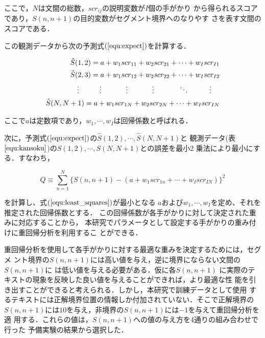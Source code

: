 ここで，$N$は文間の総数，$scr_{ij}$の説明変数が$I$個の手がかり
から得られるスコアであり，$S(n,n+1)$の目的変数がセグメント境界へのなりやす
さを表す文間のスコアである．

この観測データから次の予測式$(\ref{equ:expect})$を計算する．

\begin{eqnarray}\label{equ:expect}
\hat{S}(1,2)=a+w_{1}scr_{11}+w_{2}scr_{21}+
\cdots+w_{I}scr_{I1}\nonumber\\
\hat{S}(2,3)=a+w_{1}scr_{12}+w_{2}scr_{22}+
\cdots+w_{I}scr_{I2}\nonumber\\
\vdots\hspace{1.0cm}\vdots\hspace{1.2cm}\vdots\hspace{1.2cm}
\vdots\hspace{1.2cm}\ddots\hspace{1.0cm}\vdots\hspace{0.4cm}\nonumber\\
\hat{S}(N,N+1)=a+w_{1}scr_{1N}+w_{2}scr_{2N}+
\cdots+w_{I}scr_{IN}\nonumber\\
\end{eqnarray}

ここで$a$は定数項であり，$w_{1},\cdots,w_{I}$は回帰係数と呼ばれる．

次に，予測式$( \ref{equ:expect} )$の$\hat{S}(1,2),\cdots,\hat{S}(N,N+1)$と
観測データ(表$\ref{equ:kansoku}$)の$S(1,2),\cdots,S(N,N+1)$との誤差を最小2
乗法により最小にする．すなわち，

\begin{equation}\label{equ:least_squares}
Q\equiv
\sum_{n=1}^N \{S(n,n+1) -
(a+w_{1}scr_{1n}+ \cdots +w_{I}scr_{IN})\}^2
\end{equation}

\noindent を計算し、式$( \ref{equ:least_squares} )$が最小となる
$a$および$w_{1},\cdots,{w_I}$を定め、それを推定された回帰係数とする．
この回帰係数が各手がかりに対して決定された重みに対応することから，
本研究でパラメータとして設定する手がかりの重み付けに重回帰分析を利用するこ
とができる．

重回帰分析を使用して各手がかりに対する最適な重みを決定するためには，セグメ
ント境界の$S(n,n+1)$には高い値を与え，逆に境界にならない文間の$S(n,n+1)$に
は低い値を与える必要がある．仮に各$S(n,n+1)$
に実際のテキストの現象を反映した良い値を与えることができれば，より最適な性
能を引き出すことができると考えられる．しかし，本研究で訓練データとして使用
するテキストには正解境界位置の情報しか付加されていない．そこで正解境界の
$S(n,n+1)$には$10$を与え，非境界の$S(n,n+1)$には$-1$を与えて重回帰分析を適
用する．これらの値は，$S(n,n+1)$への値の与え方を4通りの組み合わせで行った
予備実験の結果から選択した．

